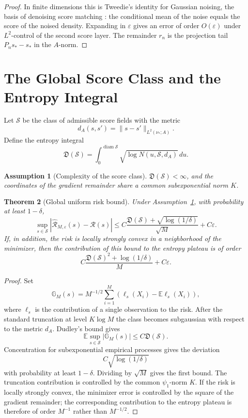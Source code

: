 \documentclass{article}
\newtheorem{theorem}{Theorem}[section]
\newtheorem{assumption}[theorem]{Assumption}
\begin{document}
\begin{proof}
In finite dimensions this is Tweedie's identity for Gaussian noising, the basis
of denoising score matching \cite{Hyvarinen,Vincent}: the
conditional mean of the noise equals the score of the noised density. Expanding
in \(\varepsilon\) gives an error of order \(O(\varepsilon)\) under \(L^2\)-control
of the second score layer. The remainder \(r_n\) is the projection tail
\(P_ns_*-s_*\) in the \(A\)-norm.
\end{proof}

\section{The Global Score Class and the Entropy Integral}

Let \(\mathcal S\) be the class of admissible score fields with the metric
\[
        d_A(s,s')=\|s-s'\|_{L^2(\nu_*;A)}.
\]
Define the entropy integral
\[
        \mathfrak D(\mathcal S)
        =
        \int_0^{\operatorname{diam}\mathcal S}
        \sqrt{\log N(u,\mathcal S,d_A)}\,du.
\]

\begin{assumption}[Complexity of the score class]
\label{ass:globalS}
\(\mathfrak D(\mathcal S)<\infty\), and the coordinates of the gradient remainder
share a common subexponential norm \(K\).
\end{assumption}

\begin{theorem}[Global uniform risk bound]
\label{thm:global-emp}
Under Assumption~\ref{ass:globalS}, with probability at least \(1-\delta\),
\[
        \sup_{s\in\mathcal S}
        |\widehat{\mathcal R}_{M,\varepsilon}(s)-\mathcal R(s)|
        \le
        C\frac{\mathfrak D(\mathcal S)+\sqrt{\log(1/\delta)}}{\sqrt M}
        +C\varepsilon.
\]
If, in addition, the risk is locally strongly convex in a neighborhood of the
minimizer, then the contribution of this bound to the entropy plateau is of order
\[
        C\frac{\mathfrak D(\mathcal S)^2+\log(1/\delta)}{M}+C\varepsilon.
\]
\end{theorem}

\begin{proof}
Set
\[
        \mathbb G_M(s)
        =
        M^{-1/2}\sum_{i=1}^M
        \left(\ell_s(X_i)-\mathbb E\ell_s(X_i)\right),
\]
where \(\ell_s\) is the contribution of a single observation to the risk. After
the standard truncation at level \(K\log M\) the class becomes subgaussian with
respect to the metric \(d_A\). Dudley's bound gives
\[
        \mathbb E\sup_{s\in\mathcal S}|\mathbb G_M(s)|
        \le
        C\mathfrak D(\mathcal S).
\]
Concentration for subexponential empirical processes \cite{BoucheronLugosiMassart} gives the deviation
\[
        C\sqrt{\log(1/\delta)}
\]
with probability at least \(1-\delta\). Dividing by \(\sqrt M\) gives the first
bound. The truncation contribution is controlled by the common \(\psi_1\)-norm
\(K\). If the risk is locally strongly convex, the minimizer error is controlled
by the square of the gradient remainder; the corresponding contribution to the
entropy plateau is therefore of order \(M^{-1}\) rather than \(M^{-1/2}\).
\end{proof}
\end{document}
